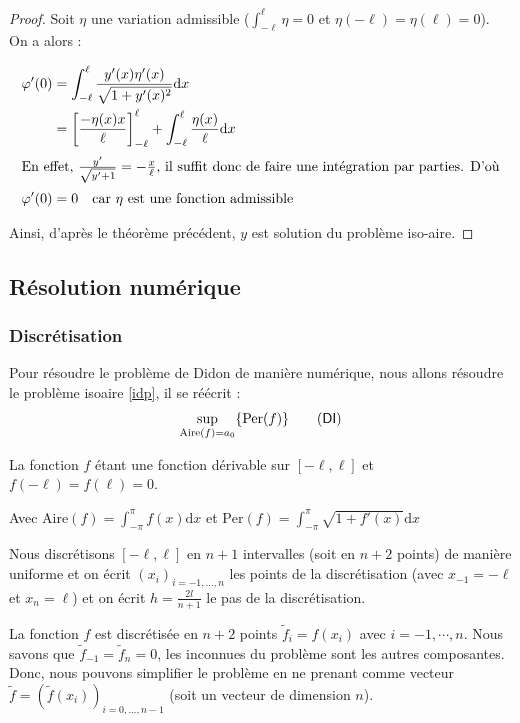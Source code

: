\documentclass[10pt,a4paper]{article}
\renewcommand{\d}{\mathrm{d}}
\newcommand{\A}{\mathrm{Aire}}
\newcommand{\p}{\mathrm{Per}}
\newcommand{\DI}{\textsf{DI}}
\theoremstyle{plain}
\theoremstyle{definition}
\begin{document}
\begin{proof}
Soit $\eta$ une variation admissible ($\int_{-\ell}^\ell\eta=0$ et $\eta(-\ell)=\eta(\ell)=0$). On a alors :

\begin{align*}
\varphi'(0) &= \int_{-\ell}^\ell \frac{y'(x)\eta'(x)}{\sqrt{1+y'(x)^2}}\d x\\
			&= \left[\frac{-\eta(x) x}{\ell}\right]_{-\ell}^\ell + \int_{-\ell}^\ell\frac{\eta(x)}{\ell}\d x\\
\intertext{En effet, $\frac{y'}{\sqrt{y'+1}}=-\frac{x}{\ell}$, il suffit donc de faire une intégration par parties. D'où}
\varphi'(0)&= 0\quad\text{car }\eta\text{ est une fonction admissible}
\end{align*}

Ainsi, d'après le théorème précédent, $y$ est solution du problème iso-aire.
\end{proof}







\subsection{Résolution numérique}

\subsubsection{Discrétisation}

Pour résoudre le problème de Didon de manière numérique, nous allons résoudre le problème isoaire \ref{idp}, il se réécrit :
\[ \sup_{\A(f)=a_0} \{ \p(f) \} \label{di}\tag{\DI} \]

La fonction $f$ étant une fonction dérivable sur $[-\ell, \ell]$ et $f(-\ell)=f(\ell)=0$.

Avec $\A(f) = \int_{-\pi}^{\pi}{f(x)}\d x$ et $\p(f) = \int_{-\pi}^{\pi}{\sqrt{1+f'(x)}\d x}$

Nous discrétisons $[-\ell, \ell]$ en $n+1$ intervalles (soit en $n+2$ points) de manière uniforme et on écrit $(x_i)_{i=-1,...,n}$ les points de la discrétisation (avec  $x_{-1}=-\ell$ et $x_n=\ell$) et on écrit $h=\frac{2l}{n+1}$ le pas de la discrétisation.

La fonction $f$ est discrétisée en $n+2$ points $\tilde{f}_i = f(x_i)$ avec $i=-1,\cdots,n$. Nous savons que $\tilde{f}_{-1} = \tilde{f}_n = 0$, les inconnues du problème sont les autres composantes. Donc, nous pouvons simplifier le problème en ne prenant comme vecteur $\tilde{f} = (\tilde{f}(x_i))_{i=0,...,n-1}$ (soit un vecteur de dimension $n$).
\end{document}
